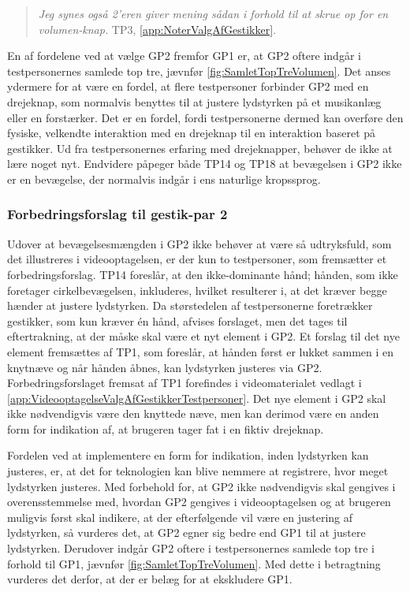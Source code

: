 % 
%
\begin{quotation}
	\noindent
	\textit{Jeg synes også 2'eren giver mening sådan i forhold til at skrue op for en volumen-knap.} TP3, \autoref{app:NoterValgAfGestikker}.
\noindent
\end{quotation}
%
En af fordelene ved at vælge GP2 fremfor GP1 er, at GP2 oftere indgår i testpersonernes samlede top tre, jævnfør \autoref{fig:SamletTopTreVolumen}. Det anses ydermere for at være en fordel, at flere testpersoner forbinder GP2 med en drejeknap, som normalvis benyttes til at justere lydstyrken på et musikanlæg eller en forstærker. Det er en fordel, fordi testpersonerne dermed kan overføre den fysiske, velkendte interaktion med en drejeknap til en interaktion baseret på gestikker. Ud fra testpersonernes erfaring med drejeknapper, behøver de ikke at lære noget nyt. Endvidere påpeger både TP14 og TP18 at bevægelsen i GP2 ikke er en bevægelse, der normalvis indgår i ens naturlige kropssprog. 
%
\subsubsection{Forbedringsforslag til gestik-par 2}
\label{TestresultaterValgAfGestikkerForbedringGP2Volumen}
%
Udover at bevægelsesmængden i GP2 ikke behøver at være så udtryksfuld, som det illustreres i videooptagelsen, er der kun to testpersoner, som fremsætter et forbedringsforslag. TP14 foreslår, at den ikke-dominante hånd; hånden, som ikke foretager cirkelbevægelsen, inkluderes, hvilket resulterer i, at det kræver begge hænder at justere lydstyrken. Da størstedelen af testpersonerne foretrækker gestikker, som kun kræver én hånd, afvises forslaget, men det tages til eftertrakning, at der måske skal være et nyt element i GP2. Et forslag til det nye element fremsættes af TP1, som foreslår, at hånden først er lukket sammen i en knytnæve og når hånden åbnes, kan lydstyrken justeres via GP2. Forbedringsforslaget fremsat af TP1 forefindes i videomaterialet vedlagt i \autoref{app:VideooptagelseValgAfGestikkerTestpersoner}. Det nye element i GP2 skal ikke nødvendigvis være den knyttede næve, men kan derimod være en anden form for indikation af, at brugeren tager fat i en fiktiv drejeknap. 

Fordelen ved at implementere en form for indikation, inden lydstyrken kan justeres, er, at det for teknologien kan blive nemmere at registrere, hvor meget lydstyrken justeres.\blankline
%    
Med forbehold for, at GP2 ikke nødvendigvis skal gengives i overensstemmelse med, hvordan GP2 gengives i videooptagelsen og at brugeren muligvis først skal indikere, at der efterfølgende vil være en justering af lydstyrken, så vurderes det, at GP2 egner sig bedre end GP1 til at justere lydstyrken. Derudover indgår GP2 oftere i testpersonernes samlede top tre i forhold til GP1, jævnfør \autoref{fig:SamletTopTreVolumen}. Med dette i betragtning vurderes det derfor, at der er belæg for at ekskludere GP1. 
%
